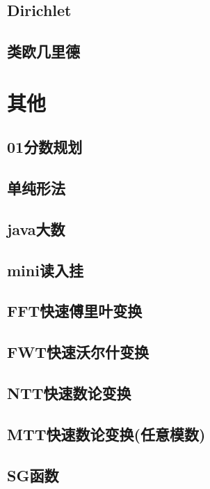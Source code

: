 \documentclass[10pt,a4paper]{article}
\begin{document}
\subsection{Dirichlet}

\subsection{类欧几里德}

\section{其他}
\subsection{01分数规划}

\subsection{单纯形法}

\subsection{java大数}

\subsection{mini读入挂}

\subsection{FFT快速傅里叶变换}

\subsection{FWT快速沃尔什变换}

\subsection{NTT快速数论变换}

\subsection{MTT快速数论变换(任意模数)}

\subsection{SG函数}

\end{document}
